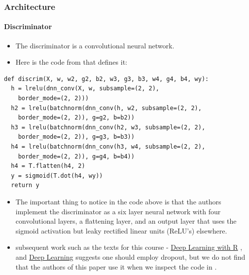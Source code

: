 \documentclass{beamer}
\begin{document}
\begin{frame}[fragile]
\frametitle{Architecture}
\framesubtitle{Discriminator}
\begin{itemize}
\item The discriminator is a convolutional neural network. 
\item Here is the code from \cite{dcganCode} that defines it:
\end{itemize}
\begin{tiny}
\begin{lstlisting}
def discrim(X, w, w2, g2, b2, w3, g3, b3, w4, g4, b4, wy):
  h = lrelu(dnn_conv(X, w, subsample=(2, 2), 
    border_mode=(2, 2)))
  h2 = lrelu(batchnorm(dnn_conv(h, w2, subsample=(2, 2), 
    border_mode=(2, 2)), g=g2, b=b2))
  h3 = lrelu(batchnorm(dnn_conv(h2, w3, subsample=(2, 2), 
    border_mode=(2, 2)), g=g3, b=b3))
  h4 = lrelu(batchnorm(dnn_conv(h3, w4, subsample=(2, 2), 
    border_mode=(2, 2)), g=g4, b=b4))
  h4 = T.flatten(h4, 2)
  y = sigmoid(T.dot(h4, wy))
  return y
\end{lstlisting}
\end{tiny}
\begin{small}
\begin{itemize}
  \item 
    The important thing to notice in the code above is that the authors implement 
    the discriminator as a six layer neural network with four convolutional layers,
    a flattening layer, and an output layer that uses the sigmoid activation but 
    leaky rectified linear units (ReLU's) elsewhere.
 \item subsequent work such as the texts for this course  - \underline{Deep
   Learning with R} \cite{deepLearnR}, and \underline{ Deep Learning} 
   \cite{deepLearnBookGenCh} suggests one should employ dropout, but we do not find 
that the authors of this paper use it  when we inspect the code in \cite{dcganCode}.
\end{itemize}
\end{small}
\end{frame}

\end{document}
